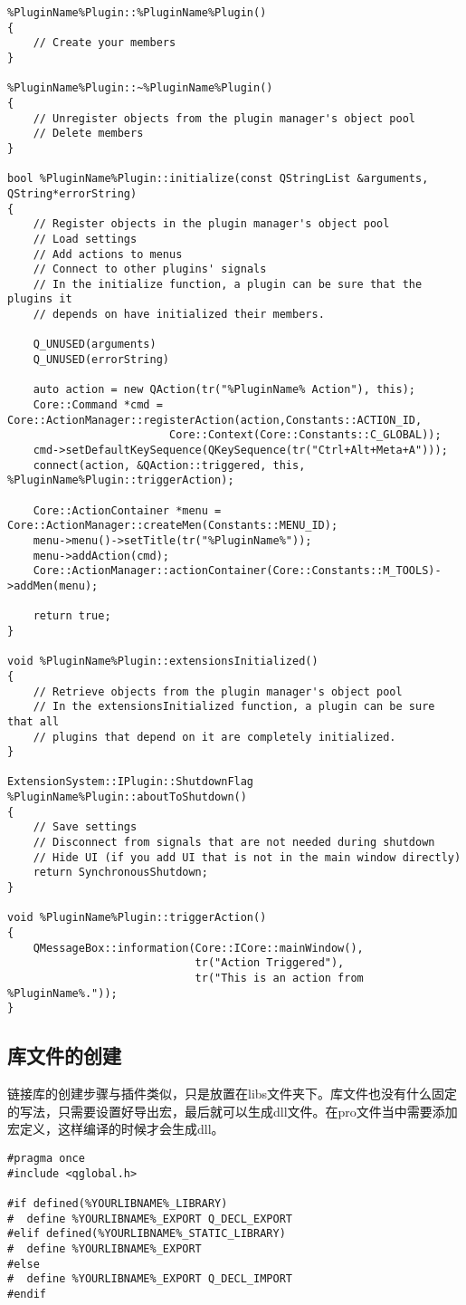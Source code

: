 \begin{lstlisting}
%PluginName%Plugin::%PluginName%Plugin()
{
    // Create your members
}

%PluginName%Plugin::~%PluginName%Plugin()
{
    // Unregister objects from the plugin manager's object pool
    // Delete members
}

bool %PluginName%Plugin::initialize(const QStringList &arguments, QString*errorString)
{
    // Register objects in the plugin manager's object pool
    // Load settings
    // Add actions to menus
    // Connect to other plugins' signals
    // In the initialize function, a plugin can be sure that the plugins it
    // depends on have initialized their members.

    Q_UNUSED(arguments)
    Q_UNUSED(errorString)

    auto action = new QAction(tr("%PluginName% Action"), this);
    Core::Command *cmd = Core::ActionManager::registerAction(action,Constants::ACTION_ID,
                         Core::Context(Core::Constants::C_GLOBAL));
    cmd->setDefaultKeySequence(QKeySequence(tr("Ctrl+Alt+Meta+A")));
    connect(action, &QAction::triggered, this, %PluginName%Plugin::triggerAction);

    Core::ActionContainer *menu = Core::ActionManager::createMen(Constants::MENU_ID);
    menu->menu()->setTitle(tr("%PluginName%"));
    menu->addAction(cmd);
    Core::ActionManager::actionContainer(Core::Constants::M_TOOLS)->addMen(menu);

    return true;
}
    
void %PluginName%Plugin::extensionsInitialized()
{
    // Retrieve objects from the plugin manager's object pool
    // In the extensionsInitialized function, a plugin can be sure that all
    // plugins that depend on it are completely initialized.
}

ExtensionSystem::IPlugin::ShutdownFlag %PluginName%Plugin::aboutToShutdown()
{
    // Save settings
    // Disconnect from signals that are not needed during shutdown
    // Hide UI (if you add UI that is not in the main window directly)
    return SynchronousShutdown;
}

void %PluginName%Plugin::triggerAction()
{
    QMessageBox::information(Core::ICore::mainWindow(),
                             tr("Action Triggered"),
                             tr("This is an action from %PluginName%."));
}   
\end{lstlisting}
\subsection{库文件的创建}
链接库的创建步骤与插件类似，只是放置在libs文件夹下。库文件也没有什么固定的写法，只需要设置好导出宏，最后就可以生成dll文件。在pro文件当中需要添加宏定义，这样编译的时候才会生成dll。
\begin{lstlisting}
#pragma once
#include <qglobal.h>

#if defined(%YOURLIBNAME%_LIBRARY)
#  define %YOURLIBNAME%_EXPORT Q_DECL_EXPORT
#elif defined(%YOURLIBNAME%_STATIC_LIBRARY)
#  define %YOURLIBNAME%_EXPORT
#else
#  define %YOURLIBNAME%_EXPORT Q_DECL_IMPORT
#endif
\end{lstlisting}